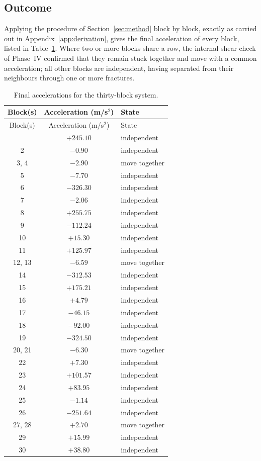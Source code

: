 \documentclass[11pt,a4paper]{article}
\begin{document}
\subsection{Outcome}

Applying the procedure of Section~\ref{sec:method} block by block, exactly as carried out in Appendix~\ref{app:derivation}, gives the final acceleration of every block, listed in Table~\ref{tab:results}. Where two or more blocks share a row, the internal shear check of Phase~IV confirmed that they remain stuck together and move with a common acceleration; all other blocks are independent, having separated from their neighbours through one or more fractures.

\begin{longtable}{c c l}
\caption{Final accelerations for the thirty-block system.}\label{tab:results}\\
\toprule
Block(s) & Acceleration (m/s$^2$) & State \\
\midrule
\endfirsthead
\toprule
Block(s) & Acceleration (m/s$^2$) & State \\
\midrule
\endhead
\midrule
\endfoot
\bottomrule
\endlastfoot
1        & $+245.10$ & independent \\
2        & $-0.90$   & independent \\
3, 4     & $-2.90$   & move together \\
5        & $-7.70$   & independent \\
6        & $-326.30$ & independent \\
7        & $-2.06$   & independent \\
8        & $+255.75$ & independent \\
9        & $-112.24$ & independent \\
10       & $+15.30$  & independent \\
11       & $+125.97$ & independent \\
12, 13   & $-6.59$   & move together \\
14       & $-312.53$ & independent \\
15       & $+175.21$ & independent \\
16       & $+4.79$   & independent \\
17       & $-46.15$  & independent \\
18       & $-92.00$  & independent \\
19       & $-324.50$ & independent \\
20, 21   & $-6.30$   & move together \\
22       & $+7.30$   & independent \\
23       & $+101.57$ & independent \\
24       & $+83.95$  & independent \\
25       & $-1.14$   & independent \\
26       & $-251.64$ & independent \\
27, 28   & $+2.70$   & move together \\
29       & $+15.99$  & independent \\
30       & $+38.80$  & independent \\
\end{longtable}
\end{document}
